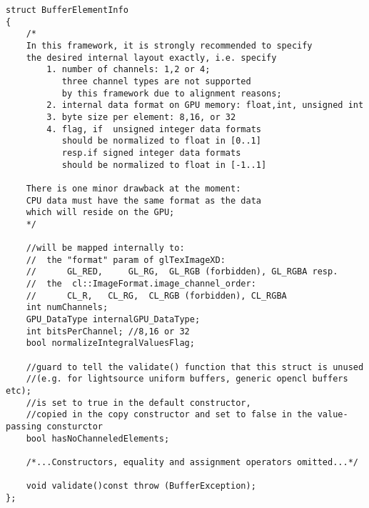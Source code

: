   	\begin{lstlisting}[caption={BufferElementInfo},label=listing:BufferElementInfo]
struct BufferElementInfo
{
	/*
	In this framework, it is strongly recommended to specify 
	the desired internal layout	exactly, i.e. specify
		1. number of channels: 1,2 or 4; 
		   three channel types are not supported 
		   by this framework due to alignment reasons;
		2. internal data format on GPU memory: float,int, unsigned int
		3. byte size per element: 8,16, or 32
		4. flag, if  unsigned integer data formats 
		   should be normalized to float in [0..1]
		   resp.if signed integer data formats 
		   should be normalized to float in [-1..1]

	There is one minor drawback at the moment: 
	CPU data must have the same format as the data 
	which will reside on the GPU;
	*/

	//will be mapped internally to:
	//	the "format" param of glTexImageXD:
	//		GL_RED, 	GL_RG, 	GL_RGB (forbidden), GL_RGBA resp.
	//	the  cl::ImageFormat.image_channel_order:
	//		CL_R, 	CL_RG,	CL_RGB (forbidden), CL_RGBA
	int numChannels; 	
	GPU_DataType internalGPU_DataType;
	int bitsPerChannel;	//8,16 or 32
	bool normalizeIntegralValuesFlag;
	
	//guard to tell the validate() function that this struct is unused
	//(e.g. for lightsource uniform buffers, generic opencl buffers etc);
	//is set to true in the default constructor,
	//copied in the copy constructor and set to false in the value-passing consturctor
	bool hasNoChanneledElements;

	/*...Constructors, equality and assignment operators omitted...*/
	
	void validate()const throw (BufferException);
};
	\end{lstlisting}




